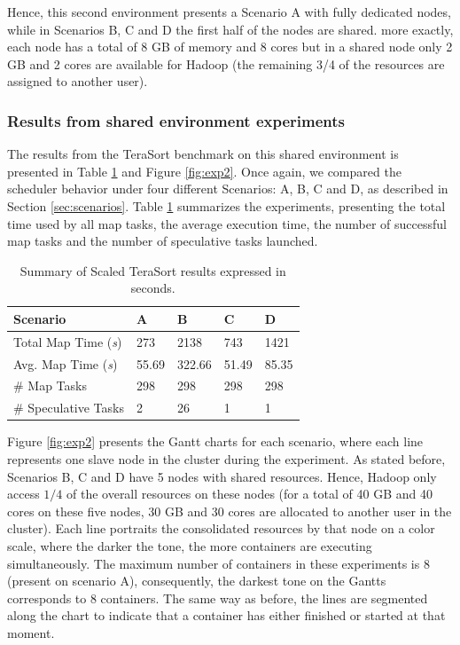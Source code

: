 Hence, this second environment presents a Scenario A with fully dedicated nodes, while in Scenarios B, C and D the first half of the nodes are shared. more exactly, each node has a total of 8 GB of memory and 8 cores but in a shared node only 2 GB  and 2 cores are available for Hadoop (the remaining 3/4 of the resources are assigned to another user). 

\subsubsection*{Results from shared environment experiments\label{sec:5.6}}


The results from the TeraSort benchmark on this shared environment is presented in Table \ref{tab:exp2} and Figure \ref{fig:exp2}. Once again, we compared the scheduler behavior under four different Scenarios: A, B, C and D, as described in Section \ref{sec:scenarios}. Table \ref{tab:exp2} summarizes the experiments, presenting the total time used by all map tasks, the average execution time, the number of successful map tasks and the number of speculative tasks launched. 

\begin{table}[h]
	\caption{Summary of Scaled TeraSort results expressed in seconds.} \label{tab:exp2}
	\begin{tabular*}{\hsize}{l|llll}
		\textbf{Scenario} & \textbf{A} & \textbf{B} & \textbf{C} & \textbf{D}\\
		\hline
		Total Map Time ({\it{s}}) & 273 & 2138 & 743 & 1421 \\
		Avg. Map Time ({\it{s}}) & 55.69 & 322.66 & 51.49 & 85.35 \\
		\# Map Tasks & 298 & 298 & 298 & 298 \\
		\# Speculative Tasks & 2 & 26 & 1 & 1 \\
	\end{tabular*}
\end{table}

Figure \ref{fig:exp2} presents the Gantt charts for each scenario, where each line represents one slave node in the cluster during the experiment. As stated before, Scenarios B, C and D have 5 nodes with shared resources. Hence, Hadoop only access $1/4$ of the overall resources on these nodes (for a total of 40 GB and 40 cores on these five nodes, 30 GB and 30 cores are allocated to another user in the cluster). Each line portraits the consolidated resources by that node on a color scale, where the darker the tone, the more containers are executing simultaneously. 
The maximum number of containers in these experiments is 8 (present on scenario A), consequently, the darkest tone on the Gantts
corresponds to 8 containers. The same way as before, the lines are segmented along the chart to indicate that a container has either finished or started at that moment. 


